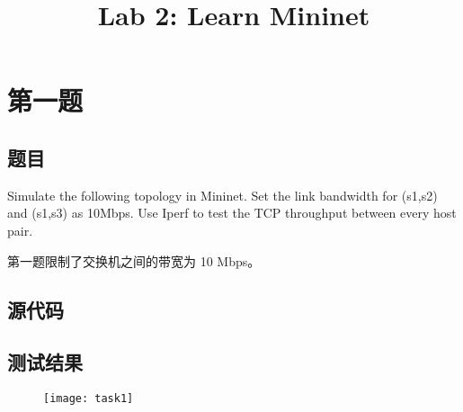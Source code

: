 \endofdump
{}

\title{Lab 2: Learn Mininet}
\maketitle
\tableofcontents

\section{第一题}
\subsection{题目}

Simulate the following topology in Mininet. Set the link bandwidth for (s1,s2) and (s1,s3) as 10Mbps. Use Iperf to test the TCP throughput between every host pair.

\begin{figure}[h]
    \centering
    
\end{figure}

第一题限制了交换机之间的带宽为 10 Mbps。

\subsection{源代码}


\subsection{测试结果}

\begin{figure}[h]
    \centering
    \begin{multicols}{2}
    \texttt{[image: task1]}

    \end{multicols}
\end{figure}

